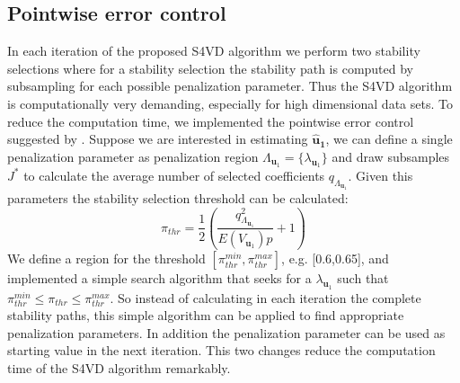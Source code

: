 \subsection{Pointwise error control}
In each iteration of the proposed S4VD algorithm we perform two stability selections where for a stability selection the stability path is computed by subsampling for each possible penalization parameter. Thus the S4VD algorithm is computationally very demanding, especially for high dimensional data sets. To reduce the computation time, we implemented the pointwise error control suggested by \citet{Meinshausen2010}. 
Suppose we are interested in estimating $\mathbf{\hat{u}_{1}}$, we can define a single penalization parameter as penalization region $\Lambda_{\mathbf{u}_{1}} = \{ \lambda_{\mathbf{u}_{1}} \}$ and draw subsamples $J^{*}$ to calculate the average number of selected coefficients $q_{\Lambda_{\mathbf{u}_{1}}}$. Given this parameters  the stability selection threshold can be calculated:
\begin{equation}
\pi_{thr} = \frac{1}{2} \left( \frac{q_{\Lambda_{\mathbf{u}_{1}}}^2}{E(V_{\mathbf{u}_{1}})p} + 1\right) 
\end{equation}
We define a region for the threshold $[\pi_{thr}^{min},\pi_{thr}^{max}]$, e.g. [0.6,0.65], and implemented a simple search algorithm that seeks for a $\lambda_{\mathbf{u}_{1}}$ such that $\pi_{thr}^{min}\leq\pi_{thr}\leq\pi_{thr}^{max}$. So instead of calculating in each iteration the complete stability paths,  
this simple algorithm can be applied to find appropriate penalization parameters. In addition the penalization parameter can be used as starting value in the next iteration. This two changes reduce the computation time of the S4VD algorithm remarkably.





